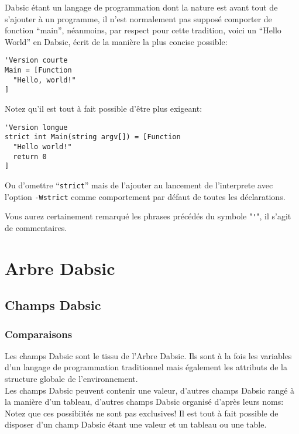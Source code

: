 \documentclass[a5paper, 12pt]{book}
\begin{document}
Dabsic étant un langage de programmation dont la nature est avant
tout de s'ajouter à un programme, il n'est normalement pas supposé
comporter de fonction ``main'', néanmoins, par respect pour cette
tradition, voici un ``Hello World'' en Dabsic, écrit de la
manière la plus concise possible:

\begin{verbatim}
'Version courte
Main = [Function
  "Hello, world!"
]
\end{verbatim}

Notez qu'il est tout à fait possible d'être plus exigeant:

\begin{verbatim}
'Version longue
strict int Main(string argv[]) = [Function
  "Hello world!"
  return 0
]
\end{verbatim}

Ou d'omettre ``\verb!strict!'' mais de l'ajouter au lancement de
l'interprete avec l'option \verb!-Wstrict! comme comportement par
défaut de toutes les déclarations.

Vous aurez certainement remarqué les phrases précédés du symbole
"\verb!'!", il s'agit de commentaires.


\mainmatter
\part{Arbre Dabsic}


\chapter{Champs Dabsic}
\section{Comparaisons}

Les champs Dabsic sont le tissu de l'Arbre Dabsic.
Ils sont à la fois les variables d'un langage de programmation
traditionnel mais également les attributs de la structure
globale de l'environnement.\\

Les champs Dabsic peuvent contenir une valeur, d'autres champs
Dabsic rangé à la manière d'un tableau, d'autres champs Dabsic
organisé d'après leurs noms: Notez que ces possibiités ne sont
pas exclusives! Il est tout à fait possible de disposer d'un
champ Dabsic étant une valeur et un tableau ou une table.\\
\end{document}
